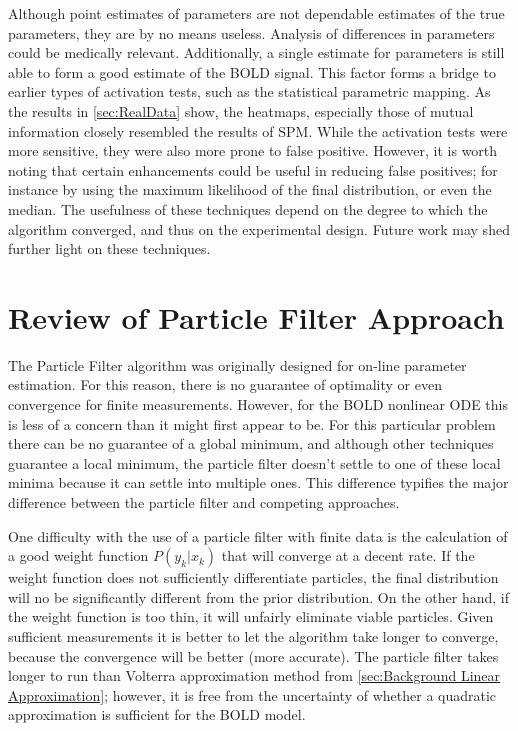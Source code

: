 Although point estimates of parameters are not dependable estimates of the 
true parameters, they are by no means useless. Analysis of differences in parameters
could be medically relevant. Additionally, a single estimate for parameters is still able
to form a good estimate of the BOLD signal. This factor forms a bridge to 
earlier types of activation tests, such as the statistical
parametric mapping. As the results in \autoref{sec:RealData} show, the heatmaps, especially
those of mutual information closely resembled the results of SPM. While the activation
tests were more sensitive, they were also more prone to false positive. However, it is
worth noting that certain enhancements could be useful in reducing false positives; for instance
by using the maximum likelihood of the final distribution, or even the median. The 
usefulness of these techniques depend on the degree to which the algorithm converged, 
and thus on the experimental design. Future work may shed further light on these
techniques. 

\section{Review of Particle Filter Approach}
The Particle Filter algorithm was originally designed for on-line parameter 
estimation. For this reason, there is no guarantee of optimality or even 
convergence for finite measurements. However, for the BOLD nonlinear ODE 
this is less of a concern than it might first appear to be. For this
particular problem there can be no guarantee of a global minimum, and although
other techniques guarantee a local minimum, the particle filter doesn't settle 
to one of these local minima because it can settle into multiple ones. This
difference typifies the major difference between the particle filter and 
competing approaches. 

One difficulty
with the use of a particle filter with finite data is the calculation of a good
weight function $P(y_k | x_k)$  that will converge at a decent rate. If the weight
function does not sufficiently differentiate particles, the final distribution will 
no be significantly different from the prior distribution. On the other hand, if the 
weight function is too thin, it will unfairly eliminate viable particles. Given sufficient
measurements it is better to let the algorithm take longer to converge, because the
convergence will be better (more accurate). The particle filter takes longer
to run than Volterra approximation method from \autoref{sec:Background Linear Approximation};
however, it is free from the uncertainty of whether a quadratic approximation is 
sufficient for the BOLD model. 

